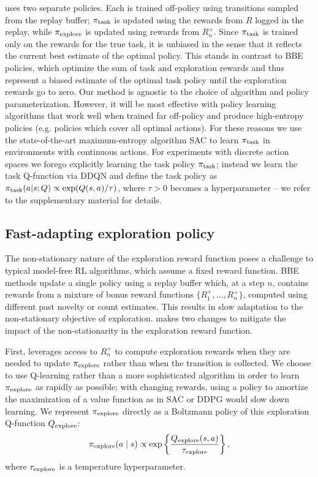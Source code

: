 \algshort{} uses two separate policies.
Each is trained off-policy using transitions sampled from the replay buffer; $\pi_{\text{task}}$ is updated using the rewards from $R$ logged in the replay, while $\pi_{\text{explore}}$ is updated using rewards from $R^+_n$.
Since $\pi_{\text{task}}$ is trained only on the rewards for the true task, it is unbiased in the sense that it reflects the current best estimate of the optimal policy.
This stands in contrast to BBE policies, which optimize the sum of task and exploration rewards and thus represent a biased estimate of the optimal task policy until the exploration rewards go to zero.
Our method is agnostic to the choice of algorithm and policy parameterization.
However, it will be most effective with policy learning algorithms that work well when trained far off-policy and produce high-entropy policies (e.g. policies which cover all optimal actions).
For these reasons we use the state-of-the-art maximum-entropy algorithm SAC to learn $\pi_{\text{task}}$ in environments with continuous actions. For experiments with discrete action spaces we forego explicitly learning the task policy $\pi_{\text{task}}$; instead we learn the task Q-function via DDQN \citep{Hasselt2016DeepRL} and define the task policy as $\pi_{\text{task}}(a | s; Q) \propto \exp(Q(s, a) / \tau)$, where $\tau > 0$ becomes a hyperparameter -- we refer to the supplementary material for details.


\subsection{Fast-adapting exploration policy} \label{sec:fast_adaptation}
The non-stationary nature of the exploration reward function poses a challenge to typical model-free RL algorithms, which assume a fixed reward function.
BBE methods update a single policy using a replay buffer which, at a step $n$, contains rewards from a mixture of bonus reward functions $\{R_1^+, \ldots, R_n^+\}$, computed using different past novelty or count estimates.
This results in slow adaptation to the non-stationary objective of exploration.
\algshort{} makes two changes to mitigate the impact of the non-stationarity in the exploration reward function.

First, \algshort{} leverages access to $R^+_n$ to compute exploration rewards when they are needed to update $\pi_{\text{explore}}$ rather than when the transition is collected.
We choose to use Q-learning rather than a more sophisticated algorithm in order to learn $\pi_{\text{explore}}$ as rapidly as possible; with changing rewards, using a policy to amortize the maximization of a value function as in SAC or DDPG would slow down learning.
We represent $\pi_{\text{explore}}$ directly as a Boltzmann policy of this exploration Q-function $Q_{\text{explore}}$:
\begin{align}
    \pi_{\text{explore}}(a \mid s) \propto \exp \left\{ \frac{Q_{\text{explore}}(s, a)}{\tau_{\text{explore}}} \right\},
\end{align}
where $\tau_{\text{explore}}$ is a temperature hyperparameter.

